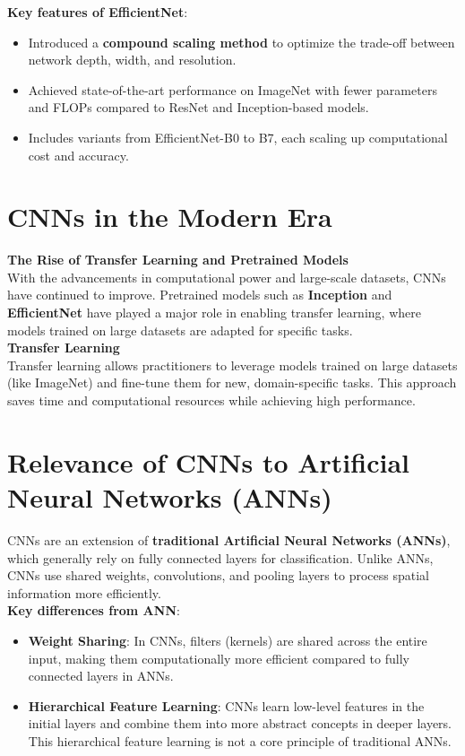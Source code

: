 \textbf{Key features of EfficientNet}:
\begin{itemize}
    \item Introduced a \textbf{compound scaling method} to optimize the trade-off between network depth, width, and resolution.
    \item Achieved state-of-the-art performance on ImageNet with fewer parameters and FLOPs compared to ResNet and Inception-based models.
    \item Includes variants from EfficientNet-B0 to B7, each scaling up computational cost and accuracy.
\end{itemize}

\section{CNNs in the Modern Era}
\textbf{The Rise of Transfer Learning and Pretrained Models}\\
With the advancements in computational power and large-scale datasets, CNNs have continued to improve. Pretrained models such as \textbf{Inception}\cite{szegedy2015googlenet} and \textbf{EfficientNet}\cite{efficientnet} have played a major role in enabling transfer learning, where models trained on large datasets are adapted for specific tasks.\\

\textbf{Transfer Learning}\\
Transfer learning allows practitioners to leverage models trained on large datasets (like ImageNet) and fine-tune them for new, domain-specific tasks. This approach saves time and computational resources while achieving high performance.

\section{Relevance of CNNs to Artificial Neural Networks (ANNs)}
CNNs are an extension of \textbf{traditional Artificial Neural Networks (ANNs)}, which generally rely on fully connected layers for classification. Unlike ANNs, CNNs use shared weights, convolutions, and pooling layers to process spatial information more efficiently.\\

\textbf{Key differences from ANN}:
\begin{itemize}
    \item \textbf{Weight Sharing}: In CNNs, filters (kernels) are shared across the entire input, making them computationally more efficient compared to fully connected layers in ANNs.\cite{bengio2009learning}
    \item \textbf{Hierarchical Feature Learning}: CNNs learn low-level features in the initial layers and combine them into more abstract concepts in deeper layers. This hierarchical feature learning is not a core principle of traditional ANNs.
\end{itemize}